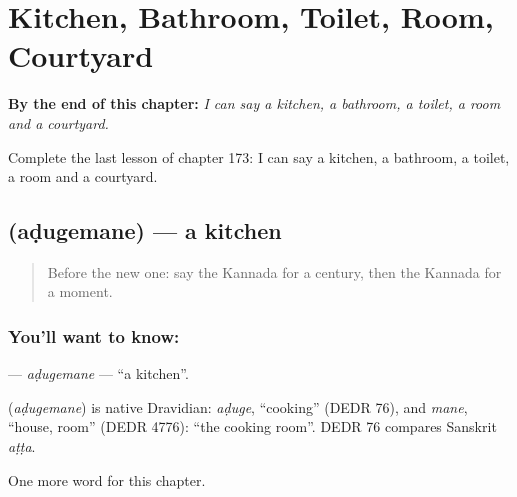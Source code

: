 
\chapter{Kitchen, Bathroom, Toilet, Room, Courtyard}
\label{ch:ka-kitchen-bathroom-toilet-room-courtyard}

\begin{chapteropening}
\textbf{By the end of this chapter:} \emph{I can say a kitchen, a bathroom, a toilet, a room and a courtyard.}

Complete the last lesson of chapter 173: I can say a kitchen, a bathroom, a toilet, a room and a courtyard.
\end{chapteropening}

\section[\texorpdfstring{\kn{ಅಡುಗೆಮನೆ} (aḍugemane)}{ಅಡುಗೆಮನೆ (aḍugemane)}]{ (aḍugemane) — a kitchen}

\label{lesson:KA-C173-adugemane}



\begin{quote}
Before the new one: say the Kannada for a century, then the Kannada for a moment.
\end{quote}

\subsection*{You'll want to know: }
\textbf{} — \emph{aḍugemane} — \textquotedblleft{}a kitchen\textquotedblright{}.

\begin{cousinweb}
\textbf{} (\emph{aḍugemane}) is native Dravidian: \emph{aḍuge}, \textquotedblleft{}cooking\textquotedblright{} (DEDR 76), and \emph{mane}, \textquotedblleft{}house, room\textquotedblright{} (DEDR 4776): \textquotedblleft{}the cooking room\textquotedblright{}. DEDR 76 compares Sanskrit \emph{aṭṭa}.
\end{cousinweb}

\begin{grammarlens}[title={What you've built}]
One more word for this chapter.
\end{grammarlens}

